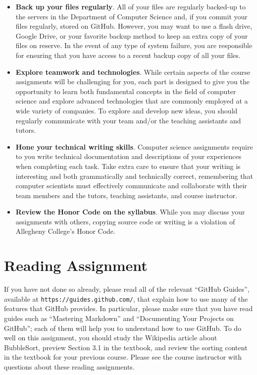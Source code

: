 \documentclass[11pt]{article}
\newcommand{\url}[1]{\lstinline{#1}}
\begin{document}
\begin{itemize}
\item {\bf Back up your files regularly}. All of your files are regularly
  backed-up to the servers in the Department of Computer Science and, if you
  commit your files regularly, stored on GitHub. However, you may want to use a
  flash drive, Google Drive, or your favorite backup method to keep an extra
  copy of your files on reserve. In the event of any type of system failure, you
  are responsible for ensuring that you have access to a recent backup copy of
  all your files.

\item {\bf Explore teamwork and technologies}. While certain aspects of the
  course assignments will be challenging for you, each part is designed to give
  you the opportunity to learn both fundamental concepts in the field of
  computer science and explore advanced technologies that are commonly employed
  at a wide variety of companies. To explore and develop new ideas, you should
  regularly communicate with your team and/or the teaching assistants and
  tutors.

\item {\bf Hone your technical writing skills}. Computer science assignments
  require to you write technical documentation and descriptions of your
  experiences when completing each task. Take extra care to ensure that your
  writing is interesting and both grammatically and technically correct,
  remembering that computer scientists must effectively communicate and
  collaborate with their team members and the tutors, teaching assistants, and
  course instructor.

\item {\bf Review the Honor Code on the syllabus}. While you may discuss your
  assignments with others, copying source code or writing is a violation of
  Allegheny College's Honor Code.

\end{itemize}

\section*{Reading Assignment}

If you have not done so already, please read all of the relevant ``GitHub
Guides'', available at \url{https://guides.github.com/}, that explain how to use
many of the features that GitHub provides. In particular, please make sure that
you have read guides such as ``Mastering Markdown'' and ``Documenting Your
Projects on GitHub''; each of them will help you to understand how to use
GitHub. To do well on this assignment, you should study the Wikipedia article
about BubbleSort, preview Section 3.1 in the textbook, and review the sorting
content in the textbook for your previous course. Please see the course
instructor with questions about these reading assignments.
\end{document}
